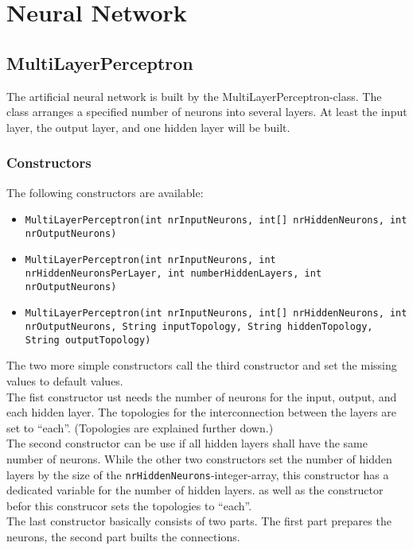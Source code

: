 \chapter{Neural Network}

\section{MultiLayerPerceptron} \label{refPositionNeuronTo}
The artificial neural network is built by the MultiLayerPerceptron-class. The class arranges a specified number of neurons into several layers. At least the input layer, the output layer, and one hidden layer will be built.

\subsection{Constructors}
The following constructors are available:
\begin{itemize}
	\item \texttt{MultiLayerPerceptron(int nrInputNeurons, int[] nrHiddenNeurons, int nrOutputNeurons)}\\
	\item \texttt{MultiLayerPerceptron(int nrInputNeurons, int nrHiddenNeuronsPerLayer, int numberHiddenLayers, int nrOutputNeurons)}\\
	\item \texttt{MultiLayerPerceptron(int nrInputNeurons, int[] nrHiddenNeurons, int nrOutputNeurons, String inputTopology, String hiddenTopology, String outputTopology)}\\
\end{itemize}
The two more simple constructors call the third constructor and set the missing values to default values.\\
The fist constructor ust needs the number of neurons for the input, output, and each hidden layer. The topologies for the interconnection between the layers are set to ``each''. (Topologies are explained further down.)
\\ The second constructor can be use if all hidden layers shall have the same number of neurons. While the other two constructors set the number of hidden layers by the size of the \texttt{nrHiddenNeurons}-integer-array, this constructor has a dedicated variable for the number of hidden layers. as well as the constructor befor this construcor sets  the topologies to ``each''.\\
The last constructor basically consists of two parts. The first part prepares the neurons, the second part builts the connections.

